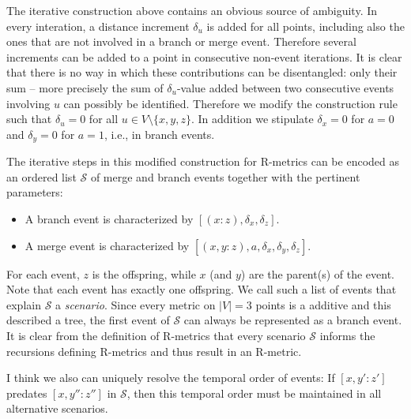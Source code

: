 \documentclass{article}
\newcommand{\TODO}[1]{\begingroup\color{red}#1\endgroup}
\begin{document}
The iterative construction above contains an obvious source of ambiguity.
In every interation, a distance increment $\delta_u$ is added for all
points, including also the ones that are not involved in a branch or merge
event. Therefore several increments can be added to a point in consecutive
non-event iterations. It is clear that there is no way in which these
contributions can be disentangled: only their sum -- more precisely the sum
of $\delta_u$-value added between two consecutive events involving $u$ can
possibly be identified. Therefore we modify the construction rule such that
$\delta_u=0$ for all $u\in V\setminus\{x,y,z\}$. In addition we stipulate
$\delta_x=0$ for $a=0$ and $\delta_y=0$ for $a=1$, i.e., in branch events.

The iterative steps in this modified construction for R-metrics can be
encoded as an ordered list $\mathcal{S}$ of merge and branch
events together with the pertinent parameters: \\
\begin{itemize} 
\item[] A branch event is characterized by $[(x:z),\delta_x,\delta_z]$.
\item[] A merge event is characterized by
  $[(x,y:z),a,\delta_x,\delta_y,\delta_z]$.
\end{itemize}
For each event, $z$ is the offspring, while $x$ (and $y$) are the parent(s)
of the event. Note that each event has exactly one offspring. We call such
a list of events that explain $\mathcal{S}$ a \emph{scenario}.  Since every
metric on $|V|=3$ points is a additive and this described a tree, the first
event of $\mathcal{S}$ can always be represented as a branch event. It is
clear from the definition of R-metrics that every scenario $\mathcal{S}$
informs the recursions defining R-metrics and thus result in an R-metric.

\TODO{I think we also can uniquely resolve the temporal order of events:
  If $[x,y':z']$ predates $[x,y'':z'']$ in $\mathcal{S}$, then this
  temporal order must be maintained in all alternative scenarios.}
\end{document}
